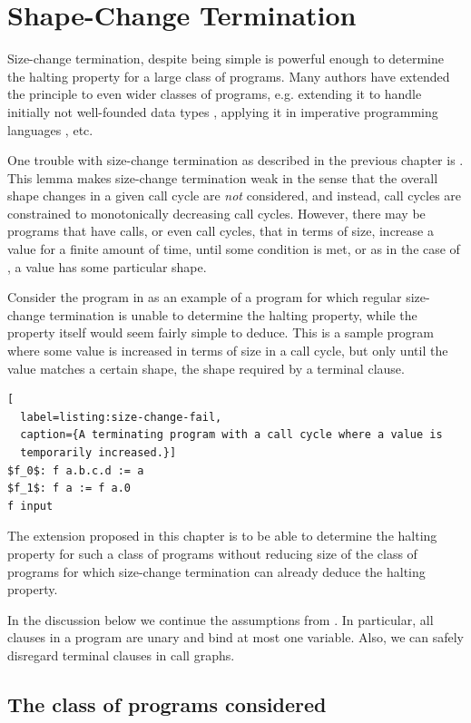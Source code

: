 \chapter{Shape-Change Termination}

Size-change termination, despite being simple is powerful enough to determine
the halting property for a large class of programs. Many authors have extended
the principle to even wider classes of programs, e.g. extending it to handle
initially not well-founded data types \cite{bound-analysis}, applying it in
imperative programming languages \cite{heaps}, etc. 

One trouble with size-change termination as described in the previous chapter
is . This lemma makes size-change termination weak
in the sense that the overall shape changes in a given call cycle are
\emph{not} considered, and instead, call cycles are constrained to
monotonically decreasing call cycles.  However, there may be programs that have
calls, or even call cycles, that in terms of size, increase a value for a
finite amount of time, until some condition is met, or as in the case of \D{},
a value has some particular shape.

Consider the program in  as an example of a
program for which regular size-change termination is unable to determine the
halting property, while the property itself would seem fairly simple to deduce.
This is a sample program where some value is increased in terms of size in a
call cycle, but only until the value matches a certain shape, the shape
required by a terminal clause.

\begin{lstlisting}[
  label=listing:size-change-fail,
  caption={A terminating program with a call cycle where a value is
  temporarily increased.}]
$f_0$: f a.b.c.d := a
$f_1$: f a := f a.0
f input
\end{lstlisting}

The extension proposed in this chapter is to be able to determine the halting
property for such a class of programs without reducing size of the class of
programs for which size-change termination can already deduce the halting
property.

In the discussion below we continue the assumptions from
. In particular, all clauses in a
program are unary and bind at most one variable. Also, we can safely disregard
terminal clauses in call graphs.

\section{The class of programs considered}

